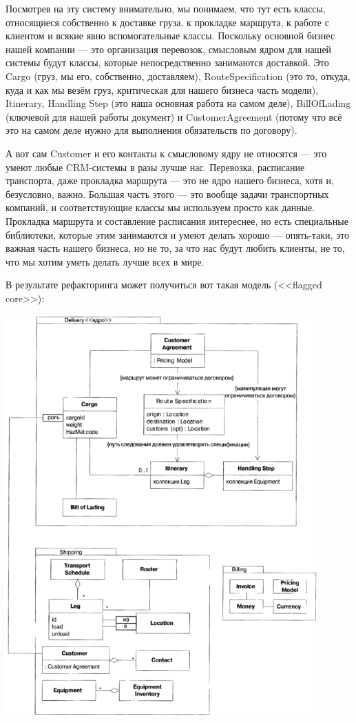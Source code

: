 \documentclass{../../text-style}
\begin{document}
Посмотрев на эту систему внимательно, мы понимаем, что тут есть классы, относящиеся собственно к доставке груза, к прокладке маршрута, к работе с клиентом и всякие явно вспомогательные классы. Поскольку основной бизнес нашей компании --- это организация перевозок, смысловым ядром для нашей системы будут классы, которые непосредственно занимаются доставкой. Это Cargo (груз, мы его, собственно, доставляем), RouteSpecification (это то, откуда, куда и как мы везём груз, критическая для нашего бизнеса часть модели), Itinerary, Handling Step (это наша основная работа на самом деле), BillOfLading (ключевой для нашей работы документ) и CustomerAgreement (потому что всё это на самом деле нужно для выполнения обязательств по договору).

А вот сам Customer и его контакты к смысловому ядру не относятся --- это умеют любые CRM-системы в разы лучше нас. Перевозка, расписание транспорта, даже прокладка маршрута --- это не ядро нашего бизнеса, хотя и, безусловно, важно. Большая часть этого --- это вообще задачи транспортных компаний, и соответствующие классы мы используем просто как данные. Прокладка маршрута и составление расписания интереснее, но есть специальные библиотеки, которые этим занимаются и умеют делать хорошо --- опять-таки, это важная часть нашего бизнеса, но не то, за что нас будут любить клиенты, не то, что мы хотим уметь делать лучше всех в мире.

В результате рефакторинга может получиться вот такая модель (<<flagged core>>):

\begin{center}
    \includegraphics[width=0.9\textwidth]{shippingDistilled.png}
\end{center}
\end{document}
